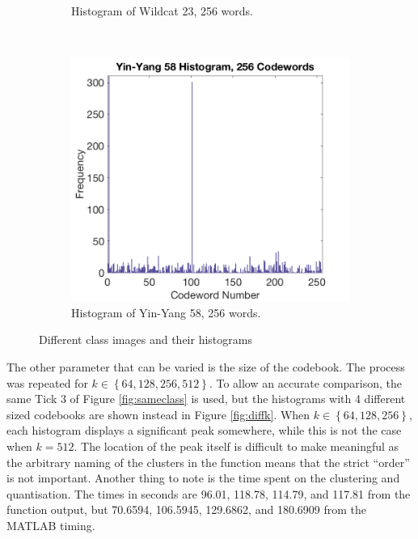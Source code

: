 \documentclass[a4paper, 10pt, conference]{ieeeconf}
\begin{document}
\begin{figure}[!ht]
\begin{subfigure}{0.45\linewidth}
      \caption{Histogram of Wildcat 23, 256 words.}
      \label{fig:diffclassd}
    \end{subfigure}
    \\
    \begin{subfigure}{0.45\linewidth}
      \includegraphics[width=\textwidth]{img/yy58_256}
      \caption{Histogram of Yin-Yang 58, 256 words.}
      \label{fig:diffclassf}
    \end{subfigure}

  \caption{Different class images and their histograms}
  \label{fig:diffclass}
\end{figure}

The other parameter that can be varied is the size of the codebook. The process was repeated for $k \in \left\{ 64, 128, 256, 512 \right\}$. To allow an accurate comparison, the same Tick 3 of Figure \ref{fig:sameclass} is used, but the histograms with 4 different sized codebooks are shown instead in Figure \ref{fig:diffk}. When $k \in \left\{ 64, 128, 256 \right\}$, each histogram displays a significant peak somewhere, while this is not the case when $k =512 $. The location of the peak itself is difficult to make meaningful as the arbitrary naming of the clusters in the function means that the strict ``order'' is not important. Another thing to note is the time spent on the clustering and quantisation. The times in seconds are 96.01, 118.78, 114.79, and 117.81 from the function output, but 70.6594, 106.5945, 129.6862, and 180.6909 from the MATLAB timing. 
\end{document}
